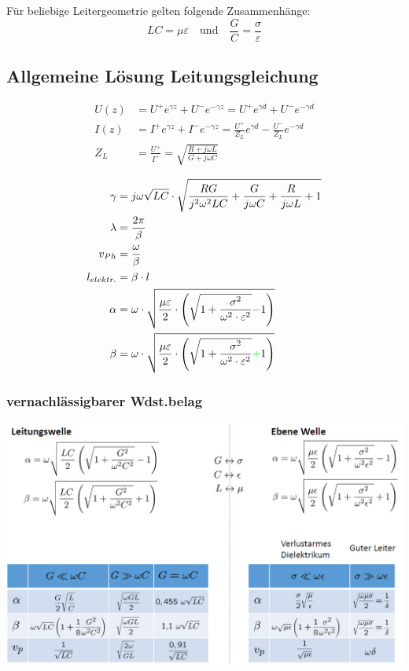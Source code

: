 \vspace{1ex}
Für beliebige Leitergeometrie gelten folgende Zusammenhänge:
\[
    LC = \mu\varepsilon \quad \text{und} \quad \frac{G}{C} = \frac{\sigma}{\varepsilon}
\]

\subsection{Allgemeine Lösung Leitungsgleichung}
\begin{align*}
    U(z) & = U^+ e^{\gamma z} + U^- e^{-\gamma z} = U^+ e^{\gamma d} + U^ - e^{-\gamma d}                      \\
    I(z) & = I^+ e^{\gamma z} + I^- e^{-\gamma z} = \frac{U^+}{Z_L}e^{\gamma d} - \frac{U^-}{Z_L}e^{-\gamma d} \\
    Z_L & = \frac{U^+}{I^+} = \sqrt{ \frac{R + j \omega L}{G + j \omega C}}
\end{align*}

\begin{align*}
    \gamma & = j \omega \sqrt{LC} \cdot \sqrt{ \frac{RG}{j^2 \omega^2 LC} + \frac{G}{j \omega C} + \frac{R}{j \omega L} + 1}\\
    \lambda & = \frac{2 \pi}{\beta} \\
    v_{Ph} & = \frac{\omega}{\beta} \\
    l_{elektr.} & = \beta \cdot l\\
    \alpha                  & = \omega \cdot \sqrt{\dfrac{\mu \varepsilon}{2}\cdot \left(\sqrt{1+\dfrac{\sigma^2}{\omega^2\cdot\varepsilon^2}}{\color{red}{-}}1\right)}   \\
    \beta                   & = \omega \cdot \sqrt{\dfrac{\mu \varepsilon}{2}\cdot \left(\sqrt{1+\dfrac{\sigma^2}{\omega^2\cdot\varepsilon^2}}{\color{green}{+}}1\right)}
\end{align*}

\subsubsection{vernachlässigbarer Wdst.belag}
\includegraphics[width=\columnwidth]{Figures/vernachlaessigbarerWiderstandsbelag.png}


